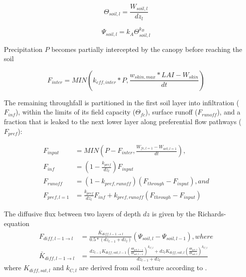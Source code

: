 \begin{equation}
\Theta_{soil,l} = \frac{W_{soil,l}}{dz_l}
\end{equation}

\begin{equation}
\Psi_{soil,l} = k_A \Theta_{soil,l}^{k_B}
\end{equation}

Precipitation $P$ becomes partially intercepted by the canopy before reaching the soil

\begin{equation}\label{eq:sse_rain_interception}
F_{inter} = MIN( k_{eff,inter} * P , \frac{w_{skin,max} * LAI - W_{skin}}{dt})
\end{equation}

The remaining throughfall is partitioned in the first soil layer into infiltration ($F_{inf}$), within the limits of its field capacity ($\Theta_{fc}$), surface runoff ($F_{runoff}$), and a fraction that is leaked to the next lower layer along preferential flow pathways ($F_{pref}$):

\begin{subequations}
\begin{align}
F_{input} &= MIN(P - F_{inter} ,\frac{W_{fc,l=1} - W_{act,l=1}}{dt}),  \\
F_{inf} &= (1 - \frac{k_{pref}}{dz_l}) F_{input}\\
F_{runoff} &= (1 - k_{pref,runoff}) (F_{through} - F_{input}), and \\
F_{pref,l=1} &= \frac{k_{pref}}{dz_l} F_{inf} + k_{pref,runoff} (F_{through} - F_{input})
\end{align}
\end{subequations}

The diffusive flux between two layers of depth $dz$ is given by the Richards-equation
\begin{subequations}
\begin{align}
F_{diff,l-1 \rightarrow l} &= \frac{\bar{K}_{diff,l-1 \rightarrow l}}{0.5*(dz_{l-1}+dz_{l})} (\Psi_{soil,l} - \Psi_{soil,l-1}), where \\
\bar{K}_{diff,l-1 \rightarrow l} &= \frac{dz_{l-1} K_{diff,sat,l-1} (\frac{\Theta_{act,l-1}}{\Theta_{sat,l-1}})^{k_{C,l}} + dz_l K_{diff,sat,l} (\frac{\Theta_{act,l}}{\Theta_{sat,l}})^{k_{C,l}} }{dz_{l-1} + dz_l}
\end{align}
\end{subequations}
where $K_{diff,sat,l}$ and ${k_{C,l}}$ are derived from soil texture according to \cite{Saxton:2006jb}.

